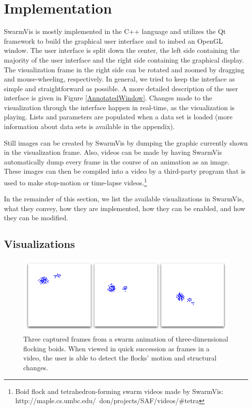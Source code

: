 \documentclass[conference]{IEEEtran}
\begin{document}
\section{Implementation}
SwarmVis is mostly  implemented in the C++ language and utilizes the Qt framework\cite{Qt:website}
to build the graphical user interface and to imbed an OpenGL window.
The user interface is split down the center,
the left side containing the majority of the user interface and the right side containing the graphical display.
The visualization frame in the right side can be rotated and zoomed by dragging and mouse-wheeling, respectively.
In general, we tried to keep the interface as simple and straightforward as possible.
A more detailed description of the user interface is given in Figure \ref{AnnotatedWindow}.
Changes made to the visualization through the interface happen in real-time, as the visualization is playing.
Lists and parameters are populated when a data set is loaded (more information about data sets is available in the appendix).

Still images can be created by SwarmVis by dumping the graphic currently shown in the visualization frame.
Also, videos can be made by having SwarmVis automatically dump every frame in the course of an animation as an image.
These images can then be compiled into a video by a third-party program that is used to make stop-motion or time-lapse
videos.\footnote{Boid flock and tetrahedron-forming swarm videos made by SwarmVis:\\
 http://maple.cs.umbc.edu/~don/projects/SAF/videos/\#tetra}

In the remainder of this section, we list the available visualizations in SwarmVis, what they convey, how they are implemented,
how they can be enabled, and how they can be modified.


\subsection{Visualizations}





\begin{figure}
\centering
\includegraphics[scale=.282]{images/animation.png}
\caption{
Three captured frames from a swarm animation of three-dimensional flocking boids\cite{reynolds1987}.
When viewed in quick succession as frames in a video, the user
is able to detect the flocks' motion and structural changes.}
\label{Animation}
\end{figure}
\end{document}
